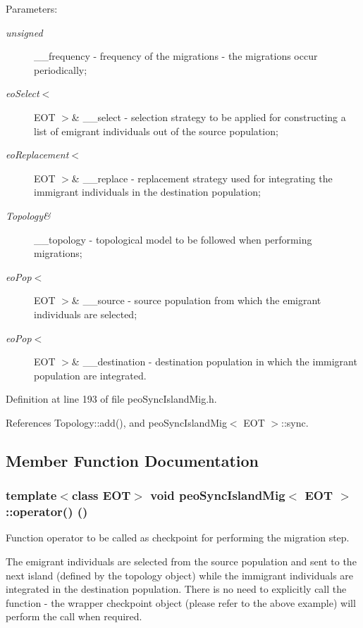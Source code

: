 \begin{Desc}
\item[Parameters:]
\begin{description}
\item[{\em unsigned}]\_\-\_\-frequency - frequency of the migrations - the migrations occur periodically; \item[{\em eo\-Select$<$}]EOT $>$\& \_\-\_\-select - selection strategy to be applied for constructing a list of emigrant individuals out of the source population; \item[{\em eo\-Replacement$<$}]EOT $>$\& \_\-\_\-replace - replacement strategy used for integrating the immigrant individuals in the destination population; \item[{\em Topology\&}]\_\-\_\-topology - topological model to be followed when performing migrations; \item[{\em eo\-Pop$<$}]EOT $>$\& \_\-\_\-source - source population from which the emigrant individuals are selected; \item[{\em eo\-Pop$<$}]EOT $>$\& \_\-\_\-destination - destination population in which the immigrant population are integrated. \end{description}
\end{Desc}


Definition at line 193 of file peo\-Sync\-Island\-Mig.h.

References Topology::add(), and peo\-Sync\-Island\-Mig$<$ EOT $>$::sync.

\subsection{Member Function Documentation}
\subsubsection{\setlength{\rightskip}{0pt plus 5cm}template$<$class EOT$>$ void {\bf peo\-Sync\-Island\-Mig}$<$ EOT $>$::operator() ()}\label{classpeo_sync_island_mig_178476fd276f78b73607b33d19522c36}


Function operator to be called as checkpoint for performing the migration step. 

The emigrant individuals are selected from the source population and sent to the next island (defined by the topology object) while the immigrant individuals are integrated in the destination population. There is no need to explicitly call the function - the wrapper checkpoint object (please refer to the above example) will perform the call when required. 

